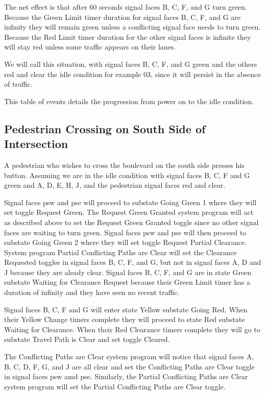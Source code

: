 \documentclass[letterpaper,twoside]{article}
\begin{document}
The net effect is that after 60 seconds signal faces
B, C, F, and G turn green.  Because the Green Limit timer duration for signal
faces B, C, F, and G are infinity they will remain green unless
a conflicting signal face needs to turn green.  Because the Red Limit
timer duration for the other signal faces is infinite they will stay red
unless some traffic appears on their lanes.

We will call this situation, with signal faces B, C, F, and G green
and the others red and clear the idle condition for example 03,
since it will persist in the absence of traffic.

This table of events details the progression from power on to the idle
condition.



\subsection{Pedestrian Crossing on South Side of Intersection}
A pedestrian who wishes to cross the boulevard on the south side
presses his button.  Assuming we are in the idle condition
with signal faces
B, C, F and G green and A, D, E, H, J, and the pedestrian signal faces
red and clear.

Signal faces psw and pse will proceed to substate Going Green 1 where
they will set
toggle Request Green.  The Request Green Granted system program will act
as described above to set the Request Green Granted toggle since no other
signal faces are waiting to turn green.  Signal faces psw and pse will then
proceed to substate Going Green 2 where they will set toggle Request Partial
Clearance.  System program Partial Conflicting Paths are Clear will set
the Clearance Requested toggles in signal faces B, C, F, and G,
but not in signal faces A, D and J because they are aleady clear.
Signal faces B, C, F, and G are in state Green substate Waiting for Clearance
Request because their Green Limit timer has a duration of infinity and
they have seen no recent traffic.

Signal faces B, C, F and G will enter state Yellow substate Going Red.
When their Yellow Change timers complete they will proceed to state Red
substate Waiting for Clearance.
When their Red Clearance timers complete they will go
to substate Travel Path is Clear and set toggle Cleared.

The Conflicting Paths are Clear system program will notice that
signal faces A, B, C, D, F, G, and J are all clear and set the
Conflicting Paths are Clear toggle in signal faces psw amd pse.  Similarly,
the Partial Conflicting Paths are Clear system program will set the
Partial Conflicting Paths are Clear toggle.
\end{document}
